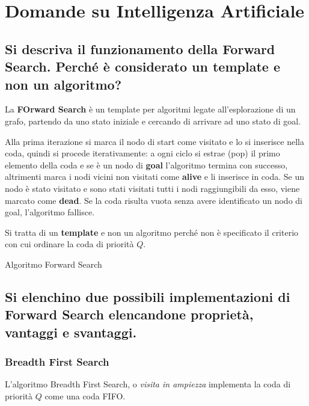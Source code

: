 \documentclass[\main/main.tex]{subfiles}
\begin{document}
\section{Domande su Intelligenza Artificiale}

\subsection{Si descriva il funzionamento della Forward Search.  Perché è considerato un template e non un algoritmo?}
La \textbf{FOrward Search} è un template per algoritmi legate all'esplorazione di un grafo, partendo da uno stato iniziale e cercando di arrivare ad uno stato di goal.

Alla prima iterazione si marca il nodo di start come visitato e lo si inserisce nella coda, quindi si procede iterativamente: a ogni ciclo si estrae (pop) il primo elemento della coda e se è un nodo di \textbf{goal} l'algoritmo termina con successo, altrimenti marca i nodi vicini non visitati come \textbf{alive} e li inserisce in coda. Se un nodo è stato visitato e sono stati visitati tutti i nodi raggiungibili da esso, viene marcato come \textbf{dead}. Se la coda risulta vuota senza avere identificato un nodo di goal, l'algoritmo fallisce.

Si tratta di un \textbf{template} e non un algoritmo perché non è specificato il criterio con cui ordinare la coda di priorità $Q$.

\begin{algorithm}
	\caption{Algoritmo Forward Search}
\end{algorithm}

\subsection{Si elenchino due possibili implementazioni di Forward Search elencandone proprietà, vantaggi e svantaggi.}

\subsubsection{Breadth First Search}
L'algoritmo Breadth First Search, o \textit{visita in ampiezza} implementa la coda di priorità $Q$ come una coda FIFO.
\end{document}
